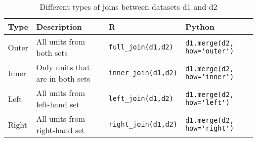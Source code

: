 \begin{table}
  \caption{\label{tab:joins}Different types of joins between datasets d1 and d2}{
  \begin{tabularx}{\linewidth}{lXll}
    \toprule
    Type &  Description  & R & Python \\
    \midrule
    Outer &  All units from both sets & \verb|full_join(d1,d2)| & \verb|d1.merge(d2, how='outer')| \\
    Inner & Only units that are in both sets & \verb|inner_join(d1,d2)| & \verb|d1.merge(d2, how='inner')| \\
    Left & All units from left-hand set & \verb|left_join(d1,d2)| & \verb|d1.merge(d2, how='left')| \\
    Right & All units from right-hand set & \verb|right_join(d1,d2)| & \verb|d1.merge(d2, how='right')| \\
    \bottomrule
  \end{tabularx}}{}
\end{table}
